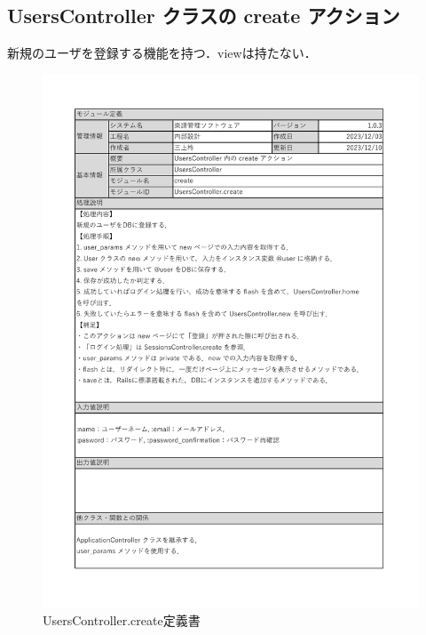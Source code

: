 \subsection*{UsersController クラスの create アクション}
新規のユーザを登録する機能を持つ．viewは持たない．
\begin{figure}[H]
	\centering
	\includegraphics[scale=0.6]{img/Users/xlsx/UsersController_create.pdf}
	\vspace{-1cm}
	\caption{UsersController.create定義書}
\end{figure}
